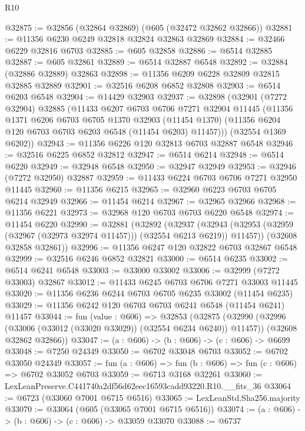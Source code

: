 \begin{lexlean}{R10}
\begin{coremodule}
@32875 := @32856 (@32864 @32869) (@605 (@32472 @32862 @32866))
@32881 := @11356 @6230 @6249 @32818 @32824 @32863 @32869
@32884 := @32466 @6229 @32816 @6703
@32885 := @605 @32858
@32886 := @6514 @32885
@32887 := @605 @32861
@32889 := @6514 @32887 @6548
@32892 := @32884 (@32886 @32889) @32863
@32898 := @11356 @6209 @6228 @32809 @32815 @32885 @32889
@32901 := @32516 @6208 @6852 @32808
@32903 := @6514 @6203 @6548
@32904 := @14429 @32903
@32937 := @32898
    (@32901
      (@7272 @32904)
      @32885
      (@11433
        @6207
        @6703
        @6706
        @7271
        @32904
        @11445
        (@11356
          @1371
          @6206
          @6703
          @6705
          @1370
          @32903
          (@11454 @1370)
          (@11356 @6204 @120 @6703 @6703 @6203 @6548 (@11454 @6203) @11457)))
      (@32554 @1369 @6202))
@32943 := @11356 @6226 @120 @32813 @6703 @32887 @6548
@32946 := @32516 @6225 @6852 @32812
@32947 := @6514 @6214
@32948 := @6514 @6220
@32949 := @32948 @6548
@32950 := @32947 @32949
@32953 := @32946 (@7272 @32950) @32887
@32959 := @11433 @6224 @6703 @6706 @7271 @32950 @11445
@32960 := @11356 @6215
@32965 := @32960 @6223 @6703 @6705 @6214 @32949
@32966 := @11454 @6214
@32967 := @32965 @32966
@32968 := @11356 @6221
@32973 := @32968 @120 @6703 @6703 @6220 @6548
@32974 := @11454 @6220
@32990 := @32881
    (@32892
      (@32937
        (@32943 (@32953 (@32959 (@32967 (@32973 @32974 @11457))) (@32554 @6213 @6219)) @11457))
      (@32608 @32858 @32861))
@32996 := @11356 @6247 @120 @32822 @6703 @32867 @6548
@32999 := @32516 @6246 @6852 @32821
@33000 := @6514 @6235
@33002 := @6514 @6241 @6548
@33003 := @33000 @33002
@33006 := @32999 (@7272 @33003) @32867
@33012 := @11433 @6245 @6703 @6706 @7271 @33003 @11445
@33020 := @11356 @6236 @6244 @6703 @6705 @6235 @33002 (@11454 @6235)
@33029 := @11356 @6242 @120 @6703 @6703 @6241 @6548 (@11454 @6241) @11457
@33044 := fun (value : @606) =>
  @32853
    (@32875
      (@32990 (@32996 (@33006 (@33012 (@33020 @33029)) (@32554 @6234 @6240)) @11457))
      (@32608 @32862 @32866))
@33047 := (a : @606) -> (b : @606) -> (c : @606) -> @6699
@33048 := @7250 @24349
@33050 := @6702 @33048 @6703
@33052 := @6702 @33050 @24349
@33057 := fun (a : @606) => fun (b : @606) => fun (c : @606) => @6702 @33052 @6703
@33059 := @6713 @3168 @32261
@33060 := LexLeanPreserve.C441740a2df56d62eec16593cadd93220.R10.__fits_36
@33064 := @6723 (@33060 @7001 @6715 @6516)
@33065 := LexLeanStd.Sha256.majority
@33070 := @33064 (@605 (@33065 @7001 @6715 @6516))
@33074 := (a : @606) -> (b : @606) -> (c : @606) -> @33059 @33070
@33088 := @6737

\end{coremodule}
\end{lexlean}
